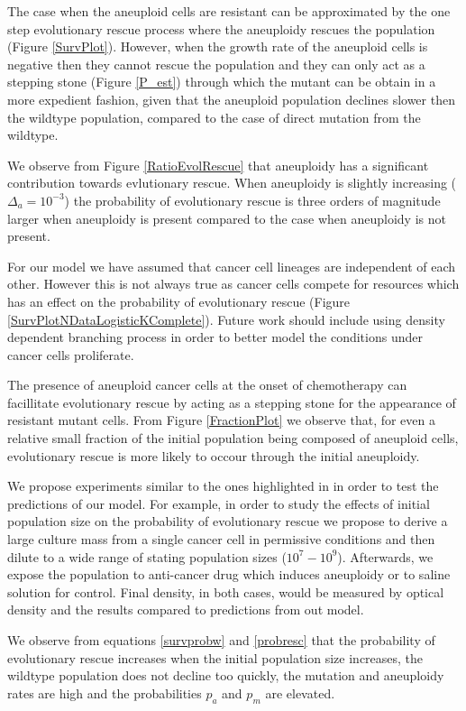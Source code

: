 \documentclass[12pt]{extarticle}
\begin{document}
The case when the aneuploid cells are resistant can be approximated by the one step evolutionary rescue process where the aneuploidy rescues the population (Figure \ref{SurvPlot}). However, when the growth rate of the aneuploid cells is negative then they cannot rescue the population and they can only act as a stepping stone (Figure \ref{P_est}) through which the mutant can be obtain in a more expedient fashion, given that the aneuploid population declines slower then the wildtype population, compared to the case of direct mutation from the wildtype. 

We observe from Figure \ref{RatioEvolRescue} that aneuploidy has a significant contribution towards evlutionary rescue. When aneuploidy is slightly increasing ($\Delta_a=10^{-3}$) the probability of evolutionary rescue is three orders of magnitude larger when aneuploidy is present compared to the case when aneuploidy is not present.

For our model we have assumed that cancer cell lineages are independent of each other. However this is not always true as cancer cells compete for resources which has an effect on the probability of evolutionary rescue (Figure \ref{SurvPlotNDataLogisticKComplete}). Future work should include using density dependent branching process in order to better model the conditions under cancer cells proliferate.

The presence of aneuploid cancer cells at the onset of chemotherapy can facillitate evolutionary rescue by acting as a stepping stone for the appearance of resistant mutant cells. From Figure \ref{FractionPlot} we observe that, for even a relative small fraction of the initial population being composed of aneuploid cells, evolutionary rescue is more likely to occour through the initial aneuploidy.

We propose experiments similar to the ones highlighted in \cite{martin2013probability} in order to test the predictions of our model. For example, in order to study the effects of initial population size on the probability of evolutionary rescue we propose to derive a large culture mass from a single cancer cell in permissive conditions and then dilute to a wide range of stating population sizes ($10^7-10^9$). Afterwards, we expose the population to anti-cancer drug which induces aneuploidy or to saline solution for control. Final density, in both cases, would be measured by optical density and the results compared to predictions from out model.

We observe from equations \eqref{survprobw} and \eqref{probresc} that the probability of evolutionary rescue increases when the initial population size increases, the wildtype population does not decline too quickly, the mutation and aneuploidy rates are high and the probabilities $p_a$ and $p_m$ are elevated.
\end{document}
